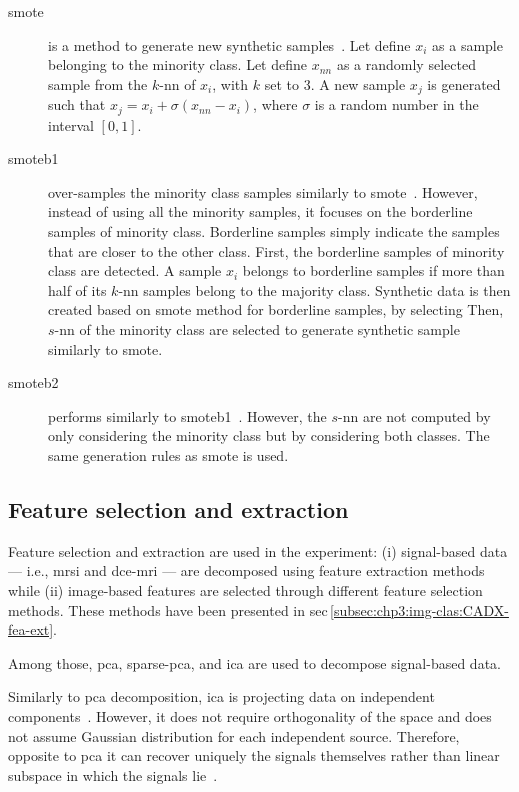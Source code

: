 \begin{description}
\item[\Ac{smote}] is a method to generate new synthetic samples~\cite{chawla2002smote}.
Let define $x_i$ as a sample belonging to the minority class.
Let define $x_{nn}$ as a randomly selected sample from the $k$-\ac{nn} of $x_i$, with $k$ set to 3.
A new sample $x_j$ is generated such that $x_j = x_i + \sigma \left( x_{nn} - x_i \right)$, where $\sigma$ is a random number in the interval $\left[0,1\right]$.
\item[\Ac{smoteb1}] over-samples the minority class samples similarly to \ac{smote}~\cite{han2005borderline}.
However, instead of using all the minority samples, it focuses on the borderline samples of minority class.
Borderline samples simply indicate the samples that are closer to the other class.
First, the borderline samples of minority class are detected.
A sample $x_{i}$ belongs to borderline samples if more than half of its $k$-\ac{nn} samples belong to the majority class.
Synthetic data is then created based on \ac{smote} method for borderline samples, by selecting 
Then, $s$-\ac{nn} of the minority class are selected to generate synthetic sample similarly to \ac{smote}.
 
\item[\Ac{smoteb2}] performs similarly to \ac{smoteb1}~\cite{han2005borderline}.
However, the $s$-\ac{nn} are not computed by only considering the minority class but by considering both classes.
The same generation rules as \ac{smote} is used.
\end{description}

\subsection{Feature selection and extraction}\label{subsec:chp6:method:fea-sel}

Feature selection and extraction are used in the experiment: (i) signal-based data --- i.e., \ac{mrsi} and \ac{dce}-\ac{mri} --- are decomposed using feature extraction methods while (ii) image-based features are selected through different feature selection methods.
These methods have been presented in \acs{sec}\,\ref{subsec:chp3:img-clas:CADX-fea-ext}.

Among those, \ac{pca}, sparse-\ac{pca}, and \ac{ica} are used to decompose signal-based data.

Similarly to \ac{pca} decomposition, \ac{ica} is projecting data on independent components~\cite{comon1994independent}.
However, it does not require orthogonality of the space and does not assume Gaussian distribution for each independent source.
Therefore, opposite to \ac{pca} it can recover uniquely the signals themselves rather than linear subspace in which the signals lie~\cite{murphy2012machine}.

